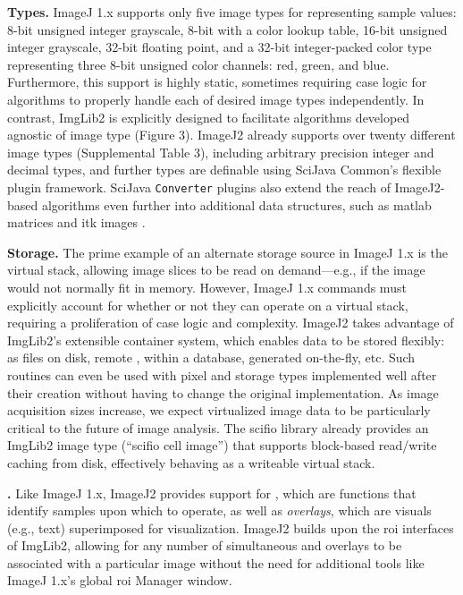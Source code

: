 \documentclass{bmcart}
\begin{document}
\textbf{Types.} ImageJ 1.x supports only five image types for representing
sample values: 8-bit unsigned integer grayscale, 8-bit with a color lookup
table, 16-bit unsigned integer grayscale, 32-bit floating point, and a 32-bit
integer-packed color type representing three 8-bit unsigned color channels:
red, green, and blue. Furthermore, this support is highly static, sometimes
requiring case logic for algorithms to properly handle each of desired image
types independently. In contrast, ImgLib2 is explicitly designed to facilitate
algorithms developed agnostic of image type (Figure 3). ImageJ2 already
supports over twenty different image types (Supplemental Table 3), including
arbitrary precision integer and decimal types, and further types are definable
using SciJava Common's flexible plugin framework. SciJava \texttt{Converter}
plugins also extend the reach of ImageJ2-based algorithms even further into
additional data structures, such as \acrshort{matlab} matrices
\cite{imagej_matlab} and \acrshort{itk} images \cite{imagej_itk}.

\textbf{Storage.} The prime example of an alternate storage source in ImageJ
1.x is the virtual stack, allowing image slices to be read on demand---e.g., if
the image would not normally fit in memory. However, ImageJ 1.x commands must
explicitly account for whether or not they can operate on a virtual stack,
requiring a proliferation of case logic and complexity. ImageJ2 takes advantage
of ImgLib2's extensible container system, which enables data to be stored
flexibly: as files on disk, remote , within a database,
generated on-the-fly, etc. Such routines can even be used with pixel and
storage types implemented well after their creation without having to change
the original implementation. As image acquisition sizes increase, we expect
virtualized image data to be particularly critical to the future of image
analysis. The \acrshort{scifio} library already provides an ImgLib2 image type
(``\acrshort{scifio} cell image'') that supports block-based read/write caching
from disk, effectively behaving as a writeable virtual stack.

\textbf{.} Like ImageJ 1.x, ImageJ2 provides support for
\textit{}, which are functions that identify samples upon which
to operate, as well as \textit{overlays}, which are visuals (e.g., text)
superimposed for visualization. ImageJ2 builds upon the \acrshort{roi}
interfaces of ImgLib2, allowing for any number of simultaneous 
and overlays to be associated with a particular image without the need for
additional tools like ImageJ 1.x's global \acrshort{roi} Manager window.
\end{document}
